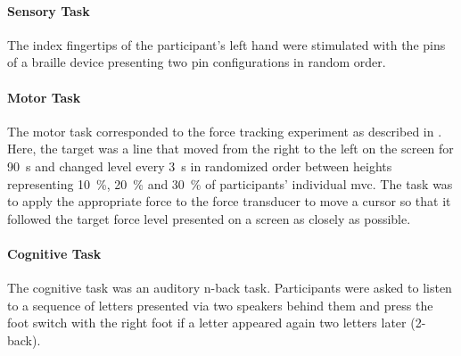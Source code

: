 \paragraph{Sensory Task}
The index fingertips of the participant's left hand were stimulated with the pins of a braille device presenting two pin configurations in random order. 
\paragraph{Motor Task} 
The motor task corresponded to the force tracking experiment as described in . Here, the target was a line that moved from the right to the left on the screen for 90~s and changed level every 3~s in randomized order between heights representing 10~\%, 20~\% and 30~\% of participants' individual \gls{mvc}. The task was to apply the appropriate force to the force transducer to move a cursor so that it followed the target force level presented on a screen as closely as possible.
\paragraph{Cognitive Task}
The cognitive task was an auditory n-back task. Participants were asked to listen to a sequence of letters presented via two speakers behind them and press the foot switch with the right foot if a letter appeared again two letters later (2-back).

